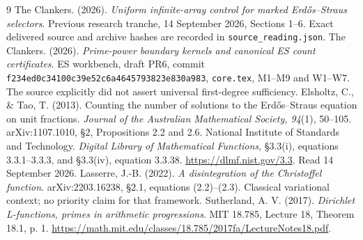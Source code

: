 \begin{thebibliography}{9}
 The Clankers. (2026). \emph{Uniform infinite-array control for marked Erd\H{o}s--Straus selectors}. Previous research tranche, 14 September 2026, Sections 1--6. Exact delivered source and archive hashes are recorded in \texttt{source\_reading.json}.
 The Clankers. (2026). \emph{Prime-power boundary kernels and canonical ES count certificates}. ES workbench, draft PR6, commit \texttt{f234ed0c34100c39e52c6a4645793823e830a983}, \texttt{core.tex}, M1--M9 and W1--W7. The source explicitly did not assert universal first-degree sufficiency.
 Elsholtz, C., \& Tao, T. (2013). Counting the number of solutions to the Erd\H{o}s--Straus equation on unit fractions. \emph{Journal of the Australian Mathematical Society, 94}(1), 50--105. arXiv:1107.1010, \S2, Propositions 2.2 and 2.6.
 National Institute of Standards and Technology. \emph{Digital Library of Mathematical Functions}, \S3.3(i), equations 3.3.1--3.3.3, and \S3.3(iv), equation 3.3.38. \url{https://dlmf.nist.gov/3.3}. Read 14 September 2026.
 Lasserre, J.-B. (2022). \emph{A disintegration of the Christoffel function}. arXiv:2203.16238, \S2.1, equations (2.2)--(2.3). Classical variational context; no priority claim for that framework.
 Sutherland, A. V. (2017). \emph{Dirichlet L-functions, primes in arithmetic progressions}. MIT 18.785, Lecture 18, Theorem 18.1, p. 1. \url{https://math.mit.edu/classes/18.785/2017fa/LectureNotes18.pdf}.
\end{thebibliography}
